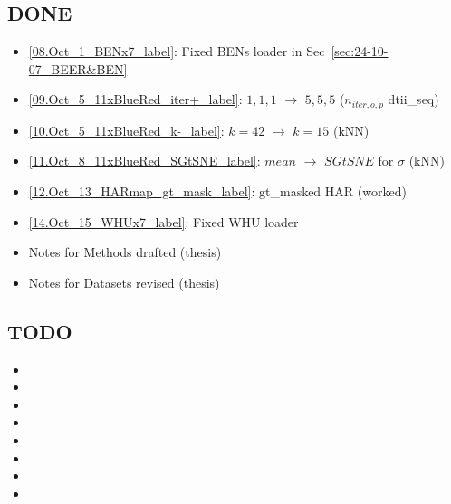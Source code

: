 

\begin{multicols}{2}
\subsection*{DONE}
\begin{itemize}
    \item \ref{08.Oct_1_BENx7_label}: Fixed BENs loader in Sec~\ref{sec:24-10-07_BEER&BEN}
    \item \ref{09.Oct_5_11xBlueRed_iter+_label}: $1,1,1$ $\rightarrow$ $5,5,5$ ($n_{iter, o, p}$ dtii\_seq)
    \item \ref{10.Oct_5_11xBlueRed_k-_label}: $k=42$ $\rightarrow$ $k=15$ (kNN)
    \item \ref{11.Oct_8_11xBlueRed_SGtSNE_label}: $mean$ $\rightarrow$ $SGtSNE$ for $\sigma$ (kNN)
    \item \ref{12.Oct_13_HARmap_gt_mask_label}: gt\_masked HAR (worked)
    \item \ref{14.Oct_15_WHUx7_label}: Fixed WHU loader
    \item Notes for Methods drafted (thesis)
    \item Notes for Datasets revised (thesis)
\end{itemize}

\subsection*{TODO}
\begin{itemize}
    \item {}
    \item 
    \item 
    \item 
    \item 
    \item 
    \item 
    \item 
\end{itemize}
\end{multicols}

\newpage

